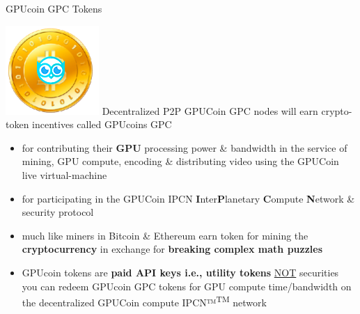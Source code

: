
\begin{frame}[t]{GPUcoin GPC Tokens }
 
\includegraphics[scale=0.2]{static/hootcoin} Decentralized P2P	 GPUCoin GPC nodes will earn crypto-token incentives called GPUcoins GPC

 \begin{itemize}[<+-| alert@+>]
 \item for contributing their \textbf{GPU} processing power \& bandwidth in the service of mining, GPU compute, encoding \& distributing video using the GPUCoin live virtual-machine 
 \item for participating in the GPUCoin IPCN \textbf{I}nter\textbf{P}lanetary \textbf{C}ompute \textbf{N}etwork \& security protocol
 \item much like miners in Bitcoin \& Ethereum earn token for mining the \textbf{cryptocurrency} in exchange for \textbf{breaking complex math puzzles}
 \item GPUcoin tokens are \textbf{paid API keys i.e., utility tokens} \underline{NOT} securities you can redeem GPUcoin GPC  tokens for GPU compute time/bandwidth on the decentralized GPUCoin compute IPCN™\textsuperscript{TM}  network
 \end{itemize}
 
\end{frame}